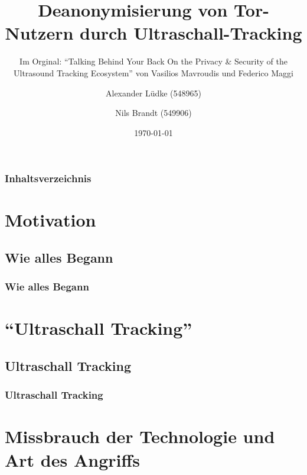 \documentclass{beamer}
\begin{document}
%
%

\title{Deanonymisierung von Tor-Nutzern durch Ultraschall-Tracking}

\subtitle{Im Orginal: "`Talking Behind Your Back
On the Privacy \& Security of the Ultrasound Tracking Ecosystem"' von Vasilios Mavroudis und Federico Maggi}

\author{
{\rm Alexander Lüdke} (548965) \\
\and %
{\rm Nils Brandt} (549906)
}

\date{\today}
\begin{frame}
\titlepage
\end{frame}

\begin{frame}
\frametitle{Inhaltsverzeichnis}\tableofcontents
\end{frame}

%
%

\section{Motivation}
\subsection{Wie alles Begann}
\begin{frame}\frametitle{Wie alles Begann} 
\end{frame}

\section{"`Ultraschall Tracking"'}
\subsection{Ultraschall Tracking}
\begin{frame}\frametitle{Ultraschall Tracking} 
\end{frame}

\section{Missbrauch der Technologie und Art des Angriffs}
\end{document}
